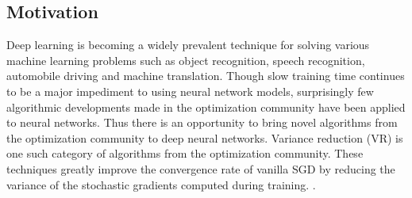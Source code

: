 \documentclass{article} %
\begin{document}
\subsection{Motivation}
Deep learning is becoming a widely prevalent technique for solving various machine learning problems such as object recognition, speech recognition, automobile driving and machine translation. 
Though slow training time continues to be a major impediment to using neural network models,
surprisingly few algorithmic developments made in the optimization community have been applied to neural networks. Thus there is an opportunity to bring novel algorithms from the optimization community to deep neural networks.
Variance reduction (VR) is one such category of algorithms from the optimization community.
These techniques greatly improve the convergence rate of vanilla SGD by reducing the variance of the stochastic gradients computed during training. \cite{JohnsonZhang2013-SVRG,Shalev-Shwartz2013-SDCA,Schmidt2013-SAG,Shalev-ShwartzZhang2014-ProxSDCA,XiaoZhang2014-ProximalSVRG,Defazio2014-Finito,Defazio2014-SAGA,Mairal2015-MISO,UniVR, exploitingstructure}.

\end{document}
